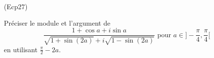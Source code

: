 \begin{tiny}(Ecp27)\end{tiny} 
Préciser le module et l'argument de
\begin{displaymath}
\frac{1+\cos a + i\sin a}{\sqrt{1 + \sin (2a)}+i \sqrt{1 - \sin (2a)}} 
\text{ pour } a\in ]-\frac{\pi}{4}, \frac{\pi}{4}[
\end{displaymath}
en utilisant $\frac{\pi}{2} - 2a$.